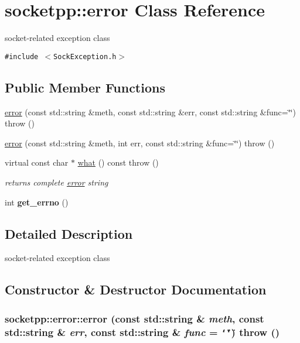 \hypertarget{classsocketpp_1_1error}{
\section{socketpp::error Class Reference}
\label{classsocketpp_1_1error}
}
socket-related exception class  


{\tt \#include $<$SockException.h$>$}

\subsection*{Public Member Functions}
\begin{CompactItemize}
\item 
\hyperlink{classsocketpp_1_1error_614fef9f326d7bb212771eb20a046290}{error} (const std::string \&meth, const std::string \&err, const std::string \&func=\char`\"{}\char`\"{})  throw ()
\item 
\hyperlink{classsocketpp_1_1error_1287e8ec1ff5f7b18d91ea65c2505ae8}{error} (const std::string \&meth, int err, const std::string \&func=\char`\"{}\char`\"{})  throw ()
\item 
\hypertarget{classsocketpp_1_1error_4b03541ebad2b9d0b73222cd505ea50f}{
virtual const char $\ast$ \hyperlink{classsocketpp_1_1error_4b03541ebad2b9d0b73222cd505ea50f}{what} () const   throw ()}
\label{classsocketpp_1_1error_4b03541ebad2b9d0b73222cd505ea50f}

\begin{CompactList}\small\item\em returns complete \hyperlink{classsocketpp_1_1error}{error} string \item\end{CompactList}\item 
\hypertarget{classsocketpp_1_1error_e1d23816909f2663b5553d232110442b}{
int \textbf{get\_\-errno} ()}
\label{classsocketpp_1_1error_e1d23816909f2663b5553d232110442b}

\end{CompactItemize}


\subsection{Detailed Description}
socket-related exception class 

\subsection{Constructor \& Destructor Documentation}
\hypertarget{classsocketpp_1_1error_614fef9f326d7bb212771eb20a046290}{
\subsubsection{\setlength{\rightskip}{0pt plus 5cm}socketpp::error::error (const std::string \& {\em meth}, \/  const std::string \& {\em err}, \/  const std::string \& {\em func} = {\tt \char`\"{}\char`\"{}})  throw ()}}
\label{classsocketpp_1_1error_614fef9f326d7bb212771eb20a046290}


